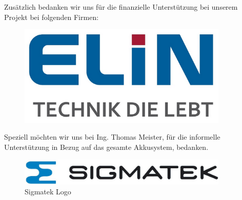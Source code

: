 Zusätzlich bedanken wir uns für die finanzielle Unterstützung bei unserem Projekt bei folgenden Firmen:

\begin{figure}[H]
	\begin{center}
		\includegraphics[width=10cm]{figures/allgemein/Elin Logo.png}
	\end{center}
\end{figure}

Speziell möchten wir uns bei Ing. Thomas Meister, für die informelle Unterstützung in Bezug auf das gesamte Akkusystem, bedanken.
\vspace{1cm}

\begin{figure} [H]
	\begin{center}
		\includegraphics[width=10cm]{figures/allgemein/Sigmatek_LOGO.jpg}
		\caption{Sigmatek Logo}
	\end{center}
\end{figure}


\newpage
\thispagestyle{empty}
\mbox{}
\newpage


